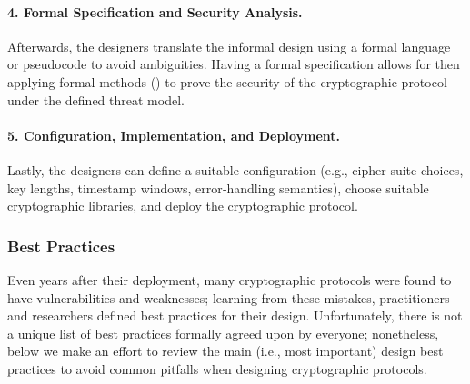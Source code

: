 \paragraph*{4. Formal Specification and Security Analysis.} Afterwards, the designers translate the informal design using a formal language or pseudocode to avoid ambiguities. Having a formal specification allows for then applying formal methods () to prove the security of the cryptographic protocol under the defined threat model.

\paragraph*{5. Configuration, Implementation, and Deployment.} Lastly, the designers can define a suitable configuration (e.g., cipher suite choices, key lengths, timestamp windows, error‑handling semantics), choose suitable cryptographic libraries, and deploy the cryptographic protocol.


\subsubsection{Best Practices}\label{sec:security_of_cryptographic_protocols:design:best_practices}

Even years after their deployment, many cryptographic protocols were found to have vulnerabilities and weaknesses; learning from these mistakes, practitioners and researchers defined best practices for their design. Unfortunately, there is not a unique list of best practices formally agreed upon by everyone; nonetheless, below we make an effort to review the main (i.e., most important) design best practices to avoid common pitfalls when designing cryptographic protocols.


